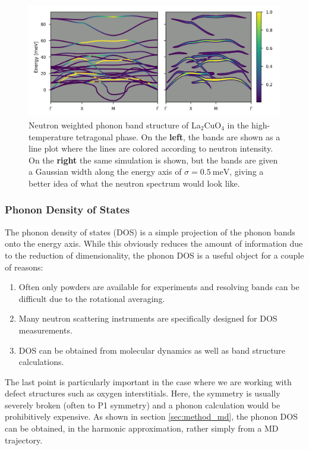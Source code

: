 \begin{figure}
	\centering
	\includegraphics[width=\textwidth]{fig/method/colorbands_example.png}
	\caption[Neutron weighted bands example]{Neutron weighted phonon band structure of La$_2$CuO$_4$ in the high-temperature tetragonal phase. On the \textbf{left}, the bands are shown as a line plot where the lines are colored according to neutron intensity. On the \textbf{right} the same simulation is shown, but the bands are given a Gaussian width along the energy axis of $\sigma = \SI{0.5}{\milli\eV}$, giving a better idea of what the neutron spectrum would look like.}
	\label{fig:bands_sqw_color_line}
\end{figure}

\subsubsection{Phonon Density of States}
The phonon density of states (DOS) is a simple projection of the phonon bands onto the energy axis. While this obviously reduces the amount of information due to the reduction of dimensionality, the phonon DOS is a useful object for a couple of reasons:

\begin{enumerate}
	\item Often only powders are available for experiments and resolving bands can be difficult due to the rotational averaging.
	\item Many neutron scattering instruments are specifically designed for DOS measurements.
	\item DOS can be obtained from molecular dynamics as well as band structure calculations.
\end{enumerate}

\noindent The last point is particularly important in the case where we are working with defect structures such as oxygen interstitials. Here, the symmetry is usually severely broken (often to P1 symmetry) and a phonon calculation would be prohibitively expensive. As shown in section \ref{sec:method_md}, the phonon DOS can be obtained, in the harmonic approximation, rather simply from a MD trajectory.


